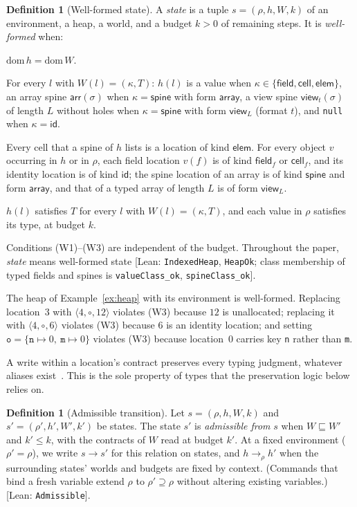 \documentclass[10pt,a4paper]{article}
\theoremstyle{definition}
\newtheorem{definition}[theorem]{Definition}
\theoremstyle{remark}
\newcommand{\tr}[1]{\xrightarrow{#1}}
\newcommand{\code}[1]{\texttt{#1}}
\newcommand{\kF}{\mathsf{field}}\newcommand{\kC}{\mathsf{cell}}\newcommand{\kE}{\mathsf{elem}}\newcommand{\kS}{\mathsf{spine}}\newcommand{\kI}{\mathsf{id}}
\newcommand{\lean}[1]{\texttt{\small #1}}
\newcommand{\status}[1]{\textsf{\small[#1]}}
\begin{document}
\begin{definition}[Well-formed state]\label{def:state}
A \emph{state} is a tuple $s=(\rho,h,W,k)$ of an environment, a heap, a
world, and a budget $k>0$ of remaining steps. It is \emph{well-formed}
when:
\begin{description}[leftmargin=1.5em,style=sameline]
\item[(W1) one domain] $\mathrm{dom}\,h=\mathrm{dom}\,W$.
\item[(W2) contents by kind] For every $l$ with $W(l)=(\kappa,T)$:
$h(l)$ is a value when $\kappa\in\{\kF,\kC,\kE\}$, an array spine
$\mathsf{arr}(\sigma)$ when $\kappa=\kS$ with form $\mathsf{array}$, a view
spine $\mathsf{view}_t(\sigma)$ of length $L$ without holes when $\kappa=\kS$
with form $\mathsf{view}_L$ (format $t$), and \code{null} when $\kappa=\kI$.
\item[(W3) valid references] Every cell that a spine of $h$ lists is a
location of kind $\kE$. For every object $v$ occurring in $h$ or in $\rho$,
each field location $v(f)$ is of kind $\kF_f$ or $\kC_f$, and its identity location
is of kind $\kI$; the spine location of an array is of kind $\kS$ and
form $\mathsf{array}$, and that of a typed array of length $L$ is of form
$\mathsf{view}_L$.
\item[(W4) contracts] $h(l)$ satisfies $T$ for every $l$ with
$W(l)=(\kappa,T)$, and each value in $\rho$ satisfies its type, at budget $k$.
\end{description}
Conditions (W1)--(W3) are independent of the budget. Throughout the paper,
\emph{state} means well-formed state
\status{Lean: \lean{IndexedHeap}, \lean{HeapOk}; class membership of typed fields and spines is \lean{valueClass\_ok}, \lean{spineClass\_ok}}.
\end{definition}

\noindent
The heap of Example~\ref{ex:heap} with its environment is well-formed.
Replacing location~$3$ with $\langle 4,\circ,12\rangle$ violates (W3)
because $12$ is unallocated; replacing it with $\langle 4,\circ,6\rangle$
violates (W3) because $6$ is an identity location; and setting
$\code{o}=\{\code{n}\mapsto 0,\ \code{m}\mapsto 0\}$ violates (W3)
because location~$0$ carries key \code{n} rather than \code{m}.

A write within a location's contract preserves every typing judgment,
whatever aliases exist~\cite{ahmed}. This is the sole property of types
that the preservation logic below relies on.

\begin{definition}[Admissible transition]\label{def:adm}
Let $s=(\rho,h,W,k)$ and $s'=(\rho',h',W',k')$ be states. The state $s'$ is
\emph{admissible from} $s$ when $W\sqsubseteq W'$ and $k'\le k$, with the
contracts of $W$ read at budget $k'$. At a fixed environment ($\rho'=\rho$),
we write $s\tr{} s'$ for this relation on states, and $h\tr{}_\rho h'$ when
the surrounding states' worlds and budgets are fixed by context. (Commands
that bind a fresh variable extend $\rho$ to $\rho'\supseteq\rho$ without
altering existing variables.)
\status{Lean: \lean{Admissible}}.
\end{definition}
\end{document}
